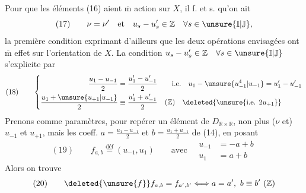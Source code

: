 Pour que les éléments (16) aient $\overline{\mathrm m}$ action sur $X$, il f. et s. qu'on ait
\[
(17)\qquad \nu=\nu'\quad\text{et}\quad u_s-u'_s\in\mathbb Z\quad\forall s\in\unsure{\mathbb I|\mathbb J},
\]
la première condition  exprimant d'ailleurs que les deux opérations envisagées ont $\overline{\mathrm m}$ effet sur l'orientation de $X$. La condition $u_s-u'_s\in\mathbb Z\quad\forall s\in\unsure{\mathbb I|\mathbb J}$ s'explicite par
\[
(18)\qquad\left\{\begin{aligned}
\frac{u_1-u_{-1}}2&=\frac{u'_1-u'_{-1}}2\qquad\text{i.e.}\quad u_1-\unsure{u_{-1}^{4}|u_{-1}}=u'_1-u'_{-1}\\
\frac{u_1+\unsure{u_{+1}|u_{-1}}}2&\equiv\frac{u'_1+u'_{-1}}2\quad(\mathbb Z)\quad\deleted{\unsure{\text{i.e. }2u_{+1}}}
\end{aligned}\right.
\]
 Prenons comme paramètres, pour repérer un élément  de $D_{\mathbb R\times\mathbb R}$, non plus ($\nu$ et) $u_{-1}$ et $u_{+1}$, mais les coeff. $a=\frac{u_1-u_{-1}}2$ et $b=\frac{u_1+u_{-1}}2$ de (14), en posant
\[
(19)\qquad f_{a,b}\overset{\mathrm{déf}}{=}(u_{-1},u_1)\qquad\text{avec}\quad\begin{aligned}u_{-1}&=-a+b\\u_1&=a+b\end{aligned}
\]
Alors on trouve
\[
(20)\qquad\deleted{\unsure{f}}f_{a,b}=f_{a',b'}\Longleftrightarrow a=a',\ b\equiv b'\ (\mathbb Z)
\]


